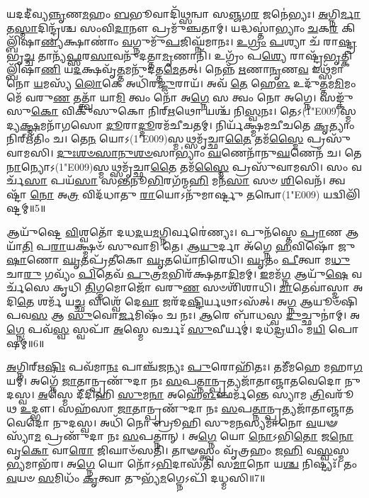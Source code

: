 𑌯𑌦𑌦𑍀॑𑌵𑍍𑌯\-\ul{𑌨𑍍𑌨𑍃}\-𑌣\-\ul{𑌮}\-𑌹𑌂 \ul{𑌬}\-𑌭𑍂𑌵𑌾𑌦𑌿᳴𑌥𑍍𑌸𑌨𑍍𑌵𑌾 𑌸\-\ul{𑌞𑍍𑌜}\-𑌗\-\ul{𑌰} 𑌜𑌨𑍇॑𑌭𑍍𑌯𑌃। 
\-\ul{𑌅}\-𑌗𑍍𑌨𑌿\-\ul{𑌰𑍍𑌮𑌾} 𑌤\-\ul{𑌸𑍍𑌮𑌾}\-𑌦𑌿𑌨𑍍𑌦𑍍𑌰᳴𑌶𑍍𑌚 𑌸𑌂𑌵𑌿\-\ul{𑌦𑌾}\-𑌨𑍗 𑌪𑍍𑌰𑌮𑍁᳴𑌞𑍍𑌚𑌤𑌾𑌮𑍍। 
𑌯𑌦𑍍𑌧𑌸𑍍𑌤𑌾॑𑌭𑍍𑌯𑌾𑌂 \ul{𑌚}\-𑌕\-\ul{𑌰} 𑌕𑌿𑌲𑍍𑌬𑌿᳴𑌷𑌾\-\ul{𑌣𑍍𑌯}\-𑌕𑍍𑌷𑌾𑌣𑌾𑌂॑ \ul{𑌵}\-𑌗𑍍𑌨𑍁𑌮𑍁᳴\-\ul{𑌪}\-𑌜𑌿𑌘𑍍𑌨᳴𑌮𑌾𑌨𑌃। 
\-\ul{𑌉}\-\-\ul{𑌗𑍍𑌰𑌂} \ul{𑌪}\-𑌶𑍍𑌯𑌾 𑌚᳴ 𑌰𑌾\-\ul{𑌷𑍍𑌟𑍍𑌰}\-𑌭𑍃\-\ul{𑌚𑍍𑌚} 𑌤𑌾𑌨𑍍𑌯᳴\-\ul{𑌫𑍍𑌸}\-𑌰\-\ul{𑌸𑌾}\-𑌵𑌨𑍁᳴𑌦𑌤𑍍𑌤𑌾\-\ul{𑌮𑍃}\-𑌣𑌾𑌨𑌿᳴। 
𑌉𑌗𑍍𑌰𑌂᳴ 𑌪\-\ul{𑌶𑍍𑌯𑍇} 𑌰𑌾𑌷𑍍𑌟𑍍𑌰᳴\-\ul{𑌭𑍃}\-𑌤𑍍𑌕𑌿𑌲𑍍𑌬𑌿᳴𑌷𑌾\-\ul{𑌣𑌿} 𑌯\-\ul{𑌦}\-𑌕𑍍𑌷𑌵𑍃᳴\-\ul{𑌤𑍍𑌤}\-𑌮𑌨𑍁᳴𑌦𑌤𑍍𑌤\-\ul{𑌮𑍇}\-𑌤𑌤𑍍। 
𑌨𑍇𑌨𑍍𑌨᳴ \ul{𑌋}\-𑌣𑌾\-\ul{𑌨𑍃}\-𑌣\-\ul{𑌵} 𑌇𑌥𑍍𑌸᳴𑌮𑌾𑌨𑍋 \ul{𑌯}\-𑌮𑌸𑍍𑌯᳴ \ul{𑌲𑍋}\-𑌕𑍇 𑌅𑌧𑌿᳴𑌰\-\ul{𑌜𑍍𑌜𑍁}\-𑌰𑌾𑌯᳴। 
𑌅𑌵᳴ \ul{𑌤𑍇} 𑌹𑍇\-\ul{𑌳} 𑌉𑌦𑍁᳴\-\ul{𑌤𑍍𑌤}\-𑌮\-\ul{𑌮𑌿}\-𑌮𑌂 𑌮𑍇᳴ 𑌵𑌰𑍁\-\ul{𑌣} 𑌤𑌤𑍍𑌤𑍍𑌵𑌾᳴ 𑌯𑌾\-\ul{𑌮𑌿} 𑌤𑍍𑌵𑌂 𑌨𑍋᳴ 𑌅\-\ul{𑌗𑍍𑌨𑍇} 𑌸 𑌤𑍍𑌵𑌂 𑌨𑍋 𑌅𑌗𑍍𑌨𑍇। 
𑌸𑌙𑍍𑌕𑍁᳴𑌸𑍁\-\ul{𑌕𑍋} 𑌵𑌿𑌕𑍁᳴𑌸𑍁𑌕𑍋 𑌨𑌿𑌰𑍍\mbox{}\-\ul{𑌋}\-𑌥𑍋 𑌯𑌶𑍍𑌚᳴ 𑌨𑌿\-\ul{𑌸𑍍𑌵}\-𑌨𑌃। 
𑌤𑍇𑌽(1\char"E009)𑌸𑍍𑌮𑌦𑍍𑌯\-\ul{𑌕𑍍𑌷𑍍𑌮}\-𑌮𑌨𑌾᳴𑌗𑌸𑍋 \ul{𑌦𑍂}\-𑌰𑌾\-\ul{𑌦𑍍𑌦𑍂}\-𑌰𑌮᳴𑌚𑍀𑌚𑌤𑌮𑍍। 
𑌨𑌿𑌰𑍍𑌯᳴𑌕𑍍𑌷𑍍𑌮𑌮𑌚𑍀𑌚𑌤𑍇 \ul{𑌕𑍃}\-𑌤𑍍𑌯𑌾𑌂 𑌨𑌿𑌰𑍍\mbox{}𑌋᳴𑌤𑌿𑌂 𑌚। 
𑌤𑍇\-\ul{𑌨} 𑌯𑍋𑌽(1\char"E009)𑌸𑍍𑌮𑌥𑍍𑌸𑌮𑍃᳴𑌚𑍍𑌛𑌾\-\ul{𑌤𑍈} 𑌤𑌮᳴\-\ul{𑌸𑍍𑌮𑍈} 𑌪𑍍𑌰𑌸𑍁᳴𑌵𑌾𑌮𑌸𑌿। 
\-\ul{𑌦𑍁𑌃}\-\-\ul{𑌶}\-\-\ul{𑍞}\-\-\ul{𑌸𑌾}\-\-\ul{𑌨𑍁}\-\-\ul{𑌶}\-\-\ul{𑍞}\-𑌸𑌾𑌭𑍍𑌯𑌾𑌂॑ \ul{𑌘}\-𑌣𑍇𑌨𑌾᳴𑌨𑍁\-\ul{𑌘}\-𑌣𑍇𑌨᳴ 𑌚। 
𑌤𑍇\-\ul{𑌨𑌾}\-𑌨𑍍𑌯𑍋𑌽(1\char"E009)𑌸𑍍𑌮𑌥𑍍𑌸𑌮𑍃᳴𑌚𑍍𑌛𑌾\-\ul{𑌤𑍈} 𑌤𑌮᳴\-\ul{𑌸𑍍𑌮𑍈} 𑌪𑍍𑌰𑌸𑍁᳴𑌵𑌾𑌮𑌸𑌿। 
𑌸𑌂 𑌵𑌰𑍍𑌚᳴\-\ul{𑌸𑌾} 𑌪𑌯᳴\-\ul{𑌸𑌾} 𑌸\-\ul{𑌨𑍍𑌤}\-𑌨𑍂\-\ul{𑌭𑌿}\-𑌰𑌗᳴𑌨𑍍𑌮\-\ul{𑌹𑌿} 𑌮𑌨᳴\-\ul{𑌸𑌾} 𑌸𑍞 \ul{𑌶𑌿}\-𑌵𑍇𑌨᳴। 
𑌤𑍍𑌵𑌷𑍍𑌟𑌾᳴ \ul{𑌨𑍋} 𑌅\-\ul{𑌤𑍍𑌰} 𑌵𑌿𑌦᳴𑌧𑌾𑌤𑍁 \ul{𑌰𑌾}\-𑌯𑍋𑌽𑌨𑍁᳴𑌮𑌾𑌰𑍍𑌷𑍍𑌟𑍁 \ul{𑌤}\-𑌨𑍍𑌵𑍋(1\char"E009) 𑌯𑌦𑍍𑌵𑌿𑌲𑌿᳴𑌷𑍍𑌟𑌮𑍍॥5॥\anuvakamend


𑌆𑌯𑍁᳴𑌷𑍍𑌟𑍇 \ul{𑌵𑌿}\-𑌶𑍍𑌵𑌤𑍋᳴ 𑌦𑌧\-\ul{𑌦}\-𑌯\-\ul{𑌮}\-𑌗𑍍𑌨𑌿𑌰𑍍𑌵𑌰𑍇॑𑌣𑍍𑌯𑌃। 
𑌪𑍁𑌨᳴𑌸𑍍𑌤𑍇 \ul{𑌪𑍍𑌰𑌾}\-𑌣 𑌆𑌯𑌾᳴\-\ul{𑌤𑌿} 𑌪\-\ul{𑌰𑌾}\-𑌯𑌕𑍍𑌷𑍍𑌮𑍞᳴ 𑌸𑍁𑌵𑌾𑌮𑌿 𑌤𑍇। 
\-\ul{𑌆}\-\-\ul{𑌯𑍁}\-𑌰𑍍𑌦𑌾 𑌅᳴𑌗𑍍𑌨𑍇 \ul{𑌹}\-𑌵𑌿𑌷𑍋᳴ 𑌜𑍁\-\ul{𑌷𑌾}\-𑌣𑍋 \ul{𑌘𑍃}\-𑌤𑌪𑍍𑌰᳴𑌤𑍀𑌕𑍋 \ul{𑌘𑍃}\-𑌤𑌯𑍋᳴𑌨𑌿𑌰𑍇𑌧𑌿। 
\-\ul{𑌘𑍃}\-𑌤𑌂 \ul{𑌪𑍀}\-𑌤𑍍𑌵𑌾 𑌮\-\ul{𑌧𑍁} 𑌚𑌾\-\ul{𑌰𑍁} 𑌗𑌵𑍍𑌯𑌂᳴ \ul{𑌪𑌿}\-𑌤𑍇𑌵᳴ \ul{𑌪𑍁}\-𑌤𑍍𑌰\-\ul{𑌮}\-𑌭𑌿𑌰᳴𑌕𑍍𑌷𑌤𑌾\-\ul{𑌦𑌿}\-𑌮𑌮𑍍। 
\-\ul{𑌇}\-𑌮𑌮᳴\-\ul{𑌗𑍍𑌨} 𑌆𑌯𑍁᳴\-\ul{𑌷𑍇} 𑌵𑌰𑍍𑌚᳴𑌸𑍇 𑌕𑍃𑌧𑌿 \ul{𑌤𑌿}\-𑌗𑍍𑌮𑌮𑍋𑌜𑍋᳴ 𑌵𑌰𑍁\-\ul{𑌣} 𑌸𑍞𑌶𑌿᳴𑌶𑌾𑌧𑌿। 
\-\ul{𑌮𑌾}\-𑌤𑍇𑌵𑌾॑𑌸𑍍𑌮𑌾 𑌅𑌦𑌿\-\ul{𑌤𑍇} 𑌶𑌰𑍍𑌮᳴ 𑌯\-\ul{𑌚𑍍𑌛} 𑌵𑌿𑌶𑍍𑌵𑍇᳴ 𑌦𑍇\-\ul{𑌵𑌾} 𑌜𑌰᳴𑌦\-\ul{𑌷𑍍𑌟𑌿}\-𑌰𑍍𑌯𑌥𑌾𑌽𑌸᳴𑌤𑍍। 
𑌅\-\ul{𑌗𑍍𑌨} 𑌆𑌯𑍂𑍞᳴𑌷𑌿 𑌪𑌵\-\ul{𑌸} 𑌆 \ul{𑌸𑍁}\-𑌵𑍋\-\ul{𑌰𑍍𑌜}\-𑌮𑌿𑌷𑌂᳴ 𑌚 𑌨𑌃। 
\-\ul{𑌆}\-𑌰𑍇 𑌬𑌾᳴𑌧𑌸𑍍𑌵 \ul{𑌦𑍁}\-𑌚𑍍𑌛𑍁𑌨𑌾॑𑌮𑍍। 
𑌅\-\ul{𑌗𑍍𑌨𑍇} 𑌪𑌵᳴\-\ul{𑌸𑍍𑌵} 𑌸𑍍𑌵𑌪𑌾᳴ \ul{𑌅}\-𑌸𑍍𑌮𑍇 𑌵𑌰𑍍𑌚𑌃᳴ \ul{𑌸𑍁}\-𑌵𑍀𑌰𑍍𑌯𑌮𑍍॑। 
𑌦𑌧᳴\-\ul{𑌦𑍍𑌰}\-𑌯𑌿𑌂 𑌮\-\ul{𑌯𑌿} 𑌪𑍋𑌷𑌮𑍍॑॥6॥

\-\ul{𑌅}\-𑌗𑍍𑌨𑌿𑌰𑍍\mbox{}𑌋\-\ul{𑌷𑌿𑌃} 𑌪𑌵᳴𑌮𑌾\-\ul{𑌨𑌃} 𑌪𑌾𑌞𑍍𑌚᳴𑌜𑌨𑍍𑌯𑌃 \ul{𑌪𑍁}\-𑌰𑍋𑌹𑌿᳴𑌤𑌃। 
𑌤𑌮𑍀᳴𑌮𑌹𑍇 𑌮𑌹𑌾\-\ul{𑌗}\-𑌯𑌮𑍍। 
𑌅𑌗𑍍𑌨𑍇᳴ \ul{𑌜𑌾}\-𑌤𑌾𑌨𑍍𑌪𑍍𑌰𑌣𑍁᳴𑌦𑌾 𑌨𑌃 \ul{𑌸}\-𑌪\-\ul{𑌤𑍍𑌨𑌾}\-𑌨𑍍𑌪𑍍𑌰𑌤𑍍𑌯𑌜𑌾᳴𑌤𑌾𑌞𑍍𑌜𑌾𑌤𑌵𑍇𑌦𑍋 𑌨𑍁𑌦𑌸𑍍𑌵। 
\-\ul{𑌅}\-𑌸𑍍𑌮𑍇 𑌦𑍀᳴𑌦𑌿𑌹𑌿 \ul{𑌸𑍁}\-𑌮\-\ul{𑌨𑌾} 𑌅𑌹𑍇᳴\-\ul{𑌳}\-𑌞𑍍𑌛𑌰𑍍𑌮᳴𑌨𑍍𑌤𑍇 𑌸𑍍𑌯𑌾𑌮 \ul{𑌤𑍍𑌰𑌿}\-𑌵𑌰𑍂᳴𑌥 \ul{𑌉}\-𑌦𑍍𑌭𑍗। 
𑌸𑌹᳴𑌸𑌾 \ul{𑌜𑌾}\-𑌤𑌾𑌨𑍍𑌪𑍍𑌰𑌣𑍁᳴𑌦𑌾 𑌨𑌃 \ul{𑌸}\-𑌪\-\ul{𑌤𑍍𑌨𑌾}\-𑌨𑍍𑌪𑍍𑌰𑌤𑍍𑌯𑌜𑌾᳴𑌤𑌾𑌞𑍍𑌜𑌾𑌤𑌵𑍇𑌦𑍋 𑌨𑍁𑌦𑌸𑍍𑌵। 
𑌅𑌧𑌿᳴ 𑌨𑍋 𑌬𑍍𑌰𑍂𑌹𑌿 𑌸𑍁𑌮\-\ul{𑌨}\-𑌸𑍍𑌯𑌮𑌾᳴𑌨𑍋 \ul{𑌵}\-𑌯𑍟 𑌸𑍍𑌯𑌾᳴\-\ul{𑌮} 𑌪𑍍𑌰𑌣𑍁᳴𑌦𑌾 𑌨𑌃 \ul{𑌸}\-𑌪𑌤𑍍𑌨𑌾𑌨𑍍। 
𑌅\-\ul{𑌗𑍍𑌨𑍇} 𑌯𑍋 \ul{𑌨𑍋}\-𑌽𑌭𑌿\-\ul{𑌤𑍋} 𑌜\-\ul{𑌨𑍋} 𑌵𑍃\-\ul{𑌕𑍋} 𑌵𑌾\-\ul{𑌰𑍋} 𑌜𑌿𑌘𑌾𑍞᳴𑌸𑌤𑌿। 
𑌤𑌾𑍟𑌸𑍍𑌤𑍍𑌵𑌂 𑌵𑍃᳴𑌤𑍍𑌰𑌹𑌂 𑌜\-\ul{𑌹𑌿} 𑌵\-\ul{𑌸𑍍𑌵}\-𑌸𑍍𑌮\-\ul{𑌭𑍍𑌯}\-𑌮𑌾𑌭᳴𑌰। 
𑌅\-\ul{𑌗𑍍𑌨𑍇} 𑌯𑍋 𑌨𑍋᳴𑌽\-\ul{𑌭𑌿}\-𑌦𑌾𑌸᳴𑌤𑌿 𑌸\-\ul{𑌮𑌾}\-𑌨𑍋 𑌯\-\ul{𑌶𑍍𑌚} 𑌨𑌿𑌷𑍍𑌟𑍍𑌯𑌃᳴। 
𑌤𑌂 \ul{𑌵}\-𑌯𑍞 \ul{𑌸}\-𑌮𑌿𑌧𑌂᳴ \ul{𑌕𑍃}\-𑌤𑍍𑌵𑌾 𑌤𑍁𑌭𑍍𑌯᳴\-\ul{𑌮}\-𑌗𑍍𑌨𑍇𑌽𑌪𑌿᳴ 𑌦𑌧𑍍𑌮𑌸𑌿॥7॥

